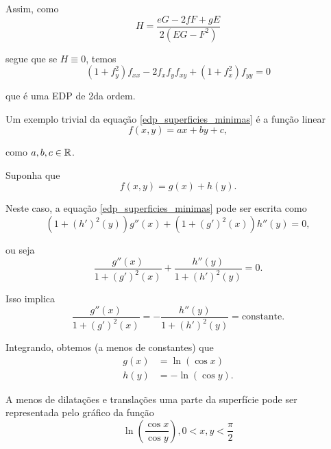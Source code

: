 \begin{exemplo}
	Assim, como
	\begin{equation*}
	H = \frac{eG - 2fF + gE}{2(EG - F^2)}
	\end{equation*}
	
	segue que se $H \equiv 0$, temos
	\begin{equation}\label{edp_superficies_minimas}
	(1 + f_y^2) f_{xx}  - 2 f_x f_y f_{xy} + (1+f_x^2) f_{yy} = 0
	\end{equation}
	
	que é uma EDP de 2da ordem.
	
	Um exemplo trivial da equação \ref{edp_superficies_minimas} é a função linear
	\begin{equation*}
	f(x,y) = ax + by + c,
	\end{equation*}
	
	como $a, b, c \in \mathbb{R}$.
\end{exemplo}

\begin{exemplo}
	Suponha que
	\begin{equation*}
	f(x,y) = g(x) + h(y).
	\end{equation*}
	
	Neste caso, a equação \ref{edp_superficies_minimas} pode ser escrita como
	\begin{equation*}
	(1 + (h')^2(y)) g''(x) + (1 + (g')^2(x)) h''(y) = 0,
	\end{equation*}
	
	ou seja
	\begin{equation*}
	\frac{g''(x)}{1 + (g')^2(x)} + \frac{h''(y)}{1 + (h')^2(y)} = 0.
	\end{equation*}
	
	Isso implica
	\begin{equation*}
	\frac{g''(x)}{1 + (g')^2(x)} = - \frac{h''(y)}{1 + (h')^2(y)} = \text{constante}.
	\end{equation*}
	
	Integrando, obtemos (a menos de constantes) que
	\begin{align*}
	g(x) &= \ln (\cos x)\\
	h(y) &= -\ln (\cos y).
	\end{align*}
	
	A menos de dilatações e translações uma parte da superfície pode ser representada pelo gráfico da função
	\begin{equation*}
	\ln \left( \frac{\cos x}{\cos y} \right), 0 < x,y < \frac{\pi}{2}
	\end{equation*}
\end{exemplo}

